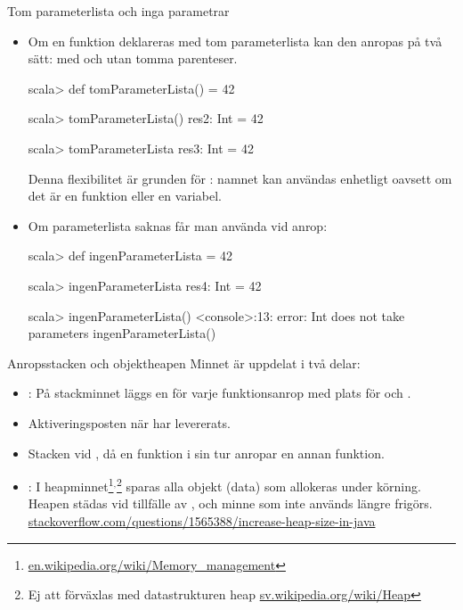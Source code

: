 \begin{Slide}{Tom parameterlista och inga parametrar}\SlideFontSmall
\begin{itemize}
\item Om en funktion deklareras med tom parameterlista \code{()} kan den anropas på två sätt: med och utan tomma parenteser.
\begin{REPL}
scala> def tomParameterLista() = 42

scala> tomParameterLista()
res2: Int = 42

scala> tomParameterLista
res3: Int = 42
\end{REPL}

Denna flexibilitet är grunden för : namnet kan användas enhetligt oavsett om det är en funktion eller en variabel.
\item Om parameterlista saknas får man  använda \code{()} vid anrop:

\begin{REPL}
scala> def ingenParameterLista = 42

scala> ingenParameterLista
res4: Int = 42

scala> ingenParameterLista()
<console>:13: error: Int does not take parameters
       ingenParameterLista()
\end{REPL}

\end{itemize}
\end{Slide}



\begin{Slide}{Anropsstacken och objektheapen}\SlideFontSmall
Minnet är uppdelat i två delar:
\begin{itemize}
\item {}: På stackminnet läggs en   för varje funktionsanrop med plats för  och .
\item Aktiveringsposten  när  har levererats.
\item Stacken  vid , då en funktion i sin tur anropar en annan funktion.

\item {}: I heapminnet\footnote{\href{https://en.wikipedia.org/wiki/Memory_management}{en.wikipedia.org/wiki/Memory\_management}}$^{,}$\footnote{Ej att förväxlas med datastrukturen heap  \href{https://sv.wikipedia.org/wiki/Heap}{sv.wikipedia.org/wiki/Heap}} sparas alla objekt (data) som allokeras under körning. Heapen städas vid tillfälle av  , och minne som inte används längre frigörs. \\\vspace{0.5em}
\href{http://stackoverflow.com/questions/1565388/increase-heap-size-in-java}{stackoverflow.com/questions/1565388/increase-heap-size-in-java}
\end{itemize}
\end{Slide}



